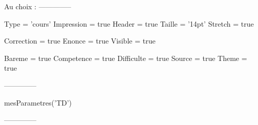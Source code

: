 \documentclass{classe-tex3R}
\begin{document}
Au choix :
--------------
\begin{luacode}

  Type = 'cours'
  Impression = true
  Header = true
  Taille = '14pt'
  Stretch = true

  Correction = true
  Enonce = true
  Visible = true
  
  Bareme = true
  Competence = true
  Difficulte = true
  Source = true
  Theme = true

\end{luacode}
\parametrage
--------------
\begin{luacode}
mesParametres('TD')
\end{luacode}
\parametrage
--------------

\end{document}
